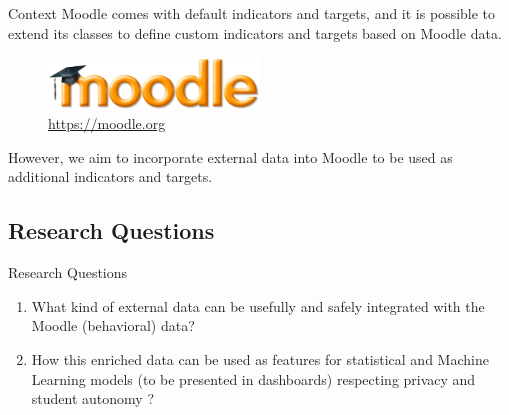 \begin{frame}{Context}
    Moodle comes with default indicators and targets, and it is possible to extend its 
    classes to define custom indicators and targets based on Moodle data. 

    \begin{figure}[H]
        \centering
        \includegraphics[width=0.5\textwidth]{../../images/moodle.jpg}
        \\ \small \url{https://moodle.org}
    \end{figure}

    However, we aim to incorporate external data into Moodle to be used 
    as additional indicators and targets.
\end{frame}

\subsection{Research Questions}
\begin{frame}{Research Questions}
    \begin{enumerate}[<+-|alert@+>]\color{gray}
        \item What kind of external data can be usefully and safely integrated with 
              the Moodle (behavioral) data?
        \item How this enriched data can be used as features for statistical and 
              Machine Learning models (to be presented in dashboards) respecting privacy and student autonomy ?
    \end{enumerate}
\end{frame}